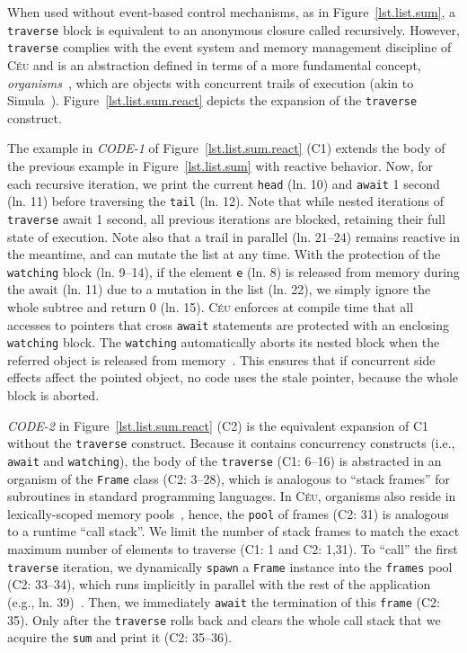 \documentclass{sig-alternate}
\newcommand{\CEU}{\textsc{C\'{e}u}\xspace}
\newcommand{\code}[1] {{\small{\texttt{#1}}}}
\newcommand{\MM}[1] {\textcircled{\tiny{\textsf{#1}}}}
\begin{document}
When used without event-based control mechanisms, as in 
Figure~\ref{lst.list.sum}, a \code{traverse} block is equivalent to an 
anonymous closure called recursively.
%
However, \code{traverse} complies with the event system and memory management 
discipline of \CEU and is an abstraction defined in terms of a more fundamental 
concept, \emph{organisms}~\cite{ceu.mod15}, which are objects with concurrent 
trails of execution (akin to Simula~\cite{simula}).
%
Figure~\ref{lst.list.sum.react} depicts the expansion of the \code{traverse} 
construct.

The example in \emph{CODE-1} of Figure~\ref{lst.list.sum.react} (\MM{C1}) 
extends the body of the previous example in Figure~\ref{lst.list.sum} with 
reactive behavior.
%
Now, for each recursive iteration, we print the current \code{head} (ln. 10) 
and \code{await} 1 second (ln. 11) before traversing the \code{tail} (ln. 12).
%
Note that while nested iterations of \code{traverse} await 1 second, all 
previous iterations are blocked, retaining their full state of execution.
%
Note also that a trail in parallel (ln. 21--24) remains reactive in the 
meantime, and can mutate the list at any time.
%
With the protection of the \code{watching} block (ln. 9--14), if the element 
\code{e} (ln. 8) is released from memory during the await (ln. 11) due to a 
mutation in the list (ln. 22), we simply ignore the whole subtree and return 0 
(ln. 15).
%
\CEU enforces at compile time that all accesses to pointers that cross 
\code{await} statements are protected with an enclosing \code{watching} block.
%
The \code{watching} automatically aborts its nested block when the referred 
object is released from memory~\cite{ceu.mod15}.
%
This ensures that if concurrent side effects affect the pointed object, no code 
uses the stale pointer, because the whole block is aborted.

\emph{CODE-2} in Figure~\ref{lst.list.sum.react} (\MM{C2}) is the equivalent 
expansion of \MM{C1} without the \code{traverse} construct.
%
Because it contains concurrency constructs (i.e., \code{await} and 
\code{watching}), the body of the \code{traverse} (\MM{C1}: 6--16) is 
abstracted in an organism of the \code{Frame} class (\MM{C2}: 3--28), which is 
analogous to ``stack frames'' for subroutines in standard programming 
languages.
%
In \CEU, organisms also reside in lexically-scoped memory 
pools~\cite{ceu.mod15}, hence, the \code{pool} of frames (\MM{C2}: 31) is 
analogous to a runtime ``call stack''.
We limit the number of stack frames to match the exact maximum number of 
elements to traverse (\MM{C1}: 1 and \MM{C2}: 1,31).
%
To ``call'' the first \code{traverse} iteration, we dynamically \code{spawn} a 
\code{Frame} instance into the \code{frames} pool (\MM{C2}: 33--34), which runs 
implicitly in parallel with the rest of the application (e.g., ln.  
39)~\cite{ceu.mod15}.
Then, we immediately \code{await} the termination of this \code{frame} 
(\MM{C2}: 35).
Only after the \code{traverse} rolls back and clears the whole call stack
that we acquire the \code{sum} and print it (\MM{C2}: 35--36).
\end{document}
